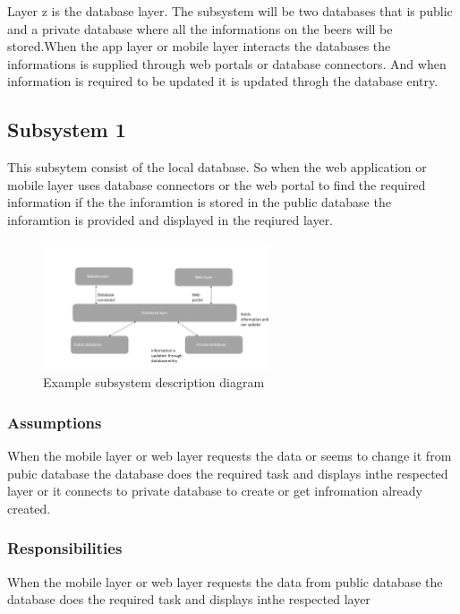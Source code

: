 Layer z is the database layer. The subsystem will be two databases that is public and a private database where all the informations on the beers will be stored.When the app layer or mobile layer interacts the databases the informations is supplied through web portals or database connectors. And when information is required to be updated it is updated throgh the database entry.
\subsection{Subsystem 1}
This subsytem consist of the local database. So when the web application or mobile layer uses database connectors or the web portal to find the required information if the the inforamtion is stored in the public database the inforamtion is provided and displayed in the reqiured layer.
\begin{figure}[h!]
	\centering
 	\includegraphics[width=0.60\textwidth]{images/database.png}
 \caption{Example subsystem description diagram}
\end{figure}

\subsubsection{Assumptions}

When the mobile layer or web layer requests the data or seems to change it from pubic database the database does the required task and displays inthe respected layer or it connects to private database to create or get infromation already created.

\subsubsection{Responsibilities}

When the mobile layer or web layer requests the data from public database the database does the required task and displays inthe respected layer
